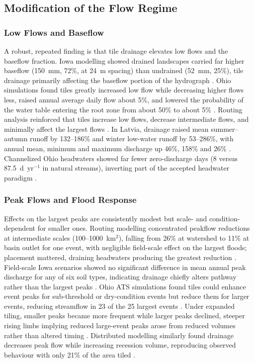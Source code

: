 \subsection{Modification of the Flow Regime}

\subsubsection{Low Flows and Baseflow}

A robust, repeated finding is that tile drainage elevates low flows and the baseflow fraction. Iowa modelling showed drained landscapes carried far higher baseflow (150~mm, 72\%, at 24~m spacing) than undrained (52~mm, 25\%), tile drainage primarily affecting the baseflow portion of the hydrograph \parencite{Schilling2008}. Ohio simulations found tiles greatly increased low flow while decreasing higher flows less, raised annual average daily flow about 5\%, and lowered the probability of the water table entering the root zone from about 50\% to about 5\% \parencite{Rathore2025}. Routing analysis reinforced that tiles increase low flows, decrease intermediate flows, and minimally affect the largest flows \parencite{Sloan2017}. In Latvia, drainage raised mean summer--autumn runoff by 132--186\% and winter low-water runoff by 53--286\%, with annual mean, minimum and maximum discharge up 46\%, 158\% and 26\% \parencite{Apsite2017}. Channelized Ohio headwaters showed far fewer zero-discharge days (8 versus 87.5~d~yr$^{-1}$ in natural streams), inverting part of the accepted headwater paradigm \parencite{King2009}.

\subsubsection{Peak Flows and Flood Response}

Effects on the largest peaks are consistently modest but scale- and condition-dependent for smaller ones. Routing modelling concentrated peakflow reductions at intermediate scales (100--1000~km$^2$), falling from 26\% at watershed to 11\% at basin outlet for one event, with negligible field-scale effect on the largest floods; placement mattered, draining headwaters producing the greatest reduction \parencite{Sloan2017}. Field-scale Iowa scenarios showed no significant difference in mean annual peak discharge for any of six soil types, indicating drainage chiefly alters pathway rather than the largest peaks \parencite{Sloan2016}. Ohio ATS simulations found tiles could enhance event peaks for sub-threshold or dry-condition events but reduce them for larger events, reducing streamflow in 23 of the 25 largest events \parencite{Rathore2025}. Under expanded tiling, smaller peaks became more frequent while larger peaks declined, steeper rising limbs implying reduced large-event peaks arose from reduced volumes rather than altered timing \parencite{Rahman2014}. Distributed modelling similarly found drainage decreases peak flow while increasing recession volume, reproducing observed behaviour with only 21\% of the area tiled \parencite{Fonley2021}.

